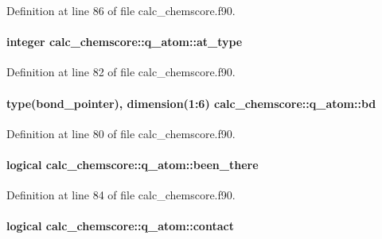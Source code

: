 Definition at line 86 of file calc\-\_\-chemscore.\-f90.

\hypertarget{structcalc__chemscore_1_1q__atom_a53f533a342d764a9ed38a4e5929bdb70}{
\paragraph[{at\-\_\-type}]{\setlength{\rightskip}{0pt plus 5cm}integer calc\-\_\-chemscore\-::q\-\_\-atom\-::at\-\_\-type}}\label{structcalc__chemscore_1_1q__atom_a53f533a342d764a9ed38a4e5929bdb70}


Definition at line 82 of file calc\-\_\-chemscore.\-f90.

\hypertarget{structcalc__chemscore_1_1q__atom_ab8271d5ededd6c275ae76897c65a1655}{
\paragraph[{bd}]{\setlength{\rightskip}{0pt plus 5cm}type({\bf bond\-\_\-pointer}), dimension(1\-:6) calc\-\_\-chemscore\-::q\-\_\-atom\-::bd}}\label{structcalc__chemscore_1_1q__atom_ab8271d5ededd6c275ae76897c65a1655}


Definition at line 80 of file calc\-\_\-chemscore.\-f90.

\hypertarget{structcalc__chemscore_1_1q__atom_af47778363b2675c3ccb7992cafd5b448}{
\paragraph[{been\-\_\-there}]{\setlength{\rightskip}{0pt plus 5cm}logical calc\-\_\-chemscore\-::q\-\_\-atom\-::been\-\_\-there}}\label{structcalc__chemscore_1_1q__atom_af47778363b2675c3ccb7992cafd5b448}


Definition at line 84 of file calc\-\_\-chemscore.\-f90.

\hypertarget{structcalc__chemscore_1_1q__atom_aa8b0c72fdf2f0bb5c4485f5af46abbfc}{
\paragraph[{contact}]{\setlength{\rightskip}{0pt plus 5cm}logical calc\-\_\-chemscore\-::q\-\_\-atom\-::contact}}\label{structcalc__chemscore_1_1q__atom_aa8b0c72fdf2f0bb5c4485f5af46abbfc}


